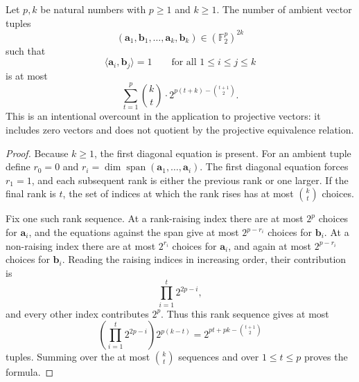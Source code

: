 \begin{lemma}
Let $p,k$ be natural numbers with $p\geq1$ and $k\geq1$.  The number of
ambient vector tuples
\[
 (\mathbf a_1,\mathbf b_1,\ldots,\mathbf a_k,\mathbf b_k)
 \in(\mathbb F_2^p)^{2k}
\]
such that
\[
 \langle\mathbf a_i,\mathbf b_j\rangle=1
 \qquad\text{for all }1\leq i\leq j\leq k
\]
is at most
\[
 \sum_{t=1}^{p}\binom kt\cdot
 2^{p(t+k)-\binom{t+1}{2}}.
\]
This is an intentional overcount in the application to projective
vectors: it includes zero vectors and does not quotient by the projective
equivalence relation.
\end{lemma}
\begin{proof}
Because $k\geq1$, the first diagonal equation is present.  For an ambient
tuple define $r_0=0$ and
$r_i=\dim\operatorname{span}(\mathbf a_1,\ldots,\mathbf a_i)$.  The first
diagonal equation forces $r_1=1$, and each subsequent rank is either the
previous rank or one larger.  If the final rank is $t$, the set of indices
at which the rank rises has at most $\binom kt$ choices.

Fix one such rank sequence.  At a rank-raising index there are at most
$2^p$ choices for $\mathbf a_i$, and the equations against the span give at
most $2^{p-r_i}$ choices for $\mathbf b_i$.  At a non-raising index there
are at most $2^{r_i}$ choices for $\mathbf a_i$, and again at most
$2^{p-r_i}$ choices for $\mathbf b_i$.  Reading the raising indices in
increasing order, their contribution is
\[
 \prod_{i=1}^{t}2^{2p-i},
\]
and every other index contributes $2^p$.  Thus this rank sequence gives at
most
\[
 \left(\prod_{i=1}^{t}2^{2p-i}\right)2^{p(k-t)}
 =2^{pt+pk-\binom{t+1}{2}}
\]
tuples.  Summing over the at most $\binom kt$ sequences and over
$1\leq t\leq p$ proves the formula.
\end{proof}
